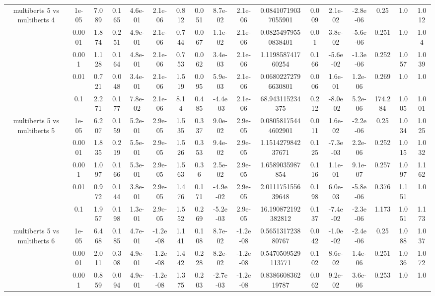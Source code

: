 \begin{tabular}{|c|c|c|c|c|c|c|c|c|c|c|c|c|c|c|c|c|}
\hline
\multirow{5}{*}{multiberts 5 vs multiberts 4} & 1e-05 & 7.089 & 0.165 & 4.6e-01 & 2.1e-06 & 0.812 & 0.051 & 8.7e-02 & 2.1e-06 & 0.08410719037055901 & 0.009 & 2.1e-02 & -2.8e-06 & 0.25 & 1.0 & 1.012 \\
 & 0.0001 & 1.874 & 0.251 & 4.9e-01 & 2.1e-06 & 0.744 & 0.067 & 1.1e-02 & 2.1e-06 & 0.08254979550838401 & 0.01 & 3.8e-02 & -5.6e-06 & 0.251 & 1.0 & 1.04 \\
 & 0.001 & 1.128 & 0.164 & 4.8e-01 & 2.1e-06 & 0.753 & 0.062 & 3.4e-03 & 2.1e-06 & 1.119858741760254 & 0.166 & -5.6e-02 & -1.3e-06 & 0.252 & 1.057 & 1.039 \\
 & 0.01 & 0.721 & 0.048 & 3.4e-01 & 2.1e-06 & 1.519 & 0.095 & 5.9e-03 & 2.1e-06 & 0.06802272796630801 & 0.006 & 1.6e-01 & 1.2e-06 & 0.269 & 1.0 & 1.0 \\
 & 0.1 & 2.271 & 0.177 & 7.8e-02 & 2.1e-06 & 8.14 & 0.485 & -4.4e-03 & 2.1e-06 & 68.943115234375 & 0.212 & -8.0e-02 & 5.2e-06 & 174.284 & 1.005 & 1.001 \\
\hline
\multirow{5}{*}{multiberts 5 vs multiberts 5} & 1e-05 & 6.207 & 0.159 & 5.2e-01 & 2.9e-05 & 1.535 & 0.337 & 9.0e-02 & 2.9e-05 & 0.08058175444602901 & 0.011 & 1.6e-02 & -2.2e-06 & 0.25 & 1.034 & 1.025 \\
 & 0.0001 & 1.835 & 0.219 & 5.5e-01 & 2.9e-05 & 1.526 & 0.353 & 9.4e-02 & 2.9e-05 & 1.151427984237671 & 0.125 & -7.3e-03 & 2.2e-06 & 0.252 & 1.015 & 1.032 \\
 & 0.001 & 1.097 & 0.166 & 5.3e-01 & 2.9e-05 & 1.563 & 0.36 & 2.5e-02 & 2.9e-05 & 1.6589035987854 & 0.116 & 1.1e-01 & 9.1e-07 & 0.257 & 1.097 & 1.162 \\
 & 0.01 & 0.972 & 0.144 & 3.8e-01 & 2.9e-05 & 1.476 & 0.171 & -4.9e-02 & 2.9e-05 & 2.011175155639648 & 0.198 & 6.0e-03 & -5.8e-06 & 0.376 & 1.151 & 1.0 \\
 & 0.1 & 1.957 & 0.198 & 1.3e-01 & 2.9e-05 & 1.552 & 0.269 & -5.2e-03 & 2.9e-05 & 16.190872192382812 & 0.137 & -7.4e-02 & -2.3e-06 & 1.173 & 1.051 & 1.173 \\
\hline
\multirow{5}{*}{multiberts 5 vs multiberts 6} & 1e-05 & 6.468 & 0.185 & 4.7e-01 & -1.2e-08 & 1.141 & 0.108 & 8.7e-02 & -1.2e-08 & 0.565131723880767 & 0.042 & -1.0e-02 & -2.4e-06 & 0.25 & 1.088 & 1.037 \\
 & 0.0001 & 2.011 & 0.308 & 4.9e-01 & -1.2e-08 & 1.442 & 0.228 & 8.2e-02 & -1.2e-08 & 0.5470509529113771 & 0.102 & 8.6e-02 & 1.4e-06 & 0.251 & 1.036 & 1.072 \\
 & 0.001 & 0.859 & 0.094 & 4.9e-01 & -1.2e-08 & 1.375 & 0.203 & -2.7e-03 & -1.2e-08 & 0.838660836219787 & 0.062 & 9.2e-02 & 3.6e-06 & 0.253 & 1.0 & 1.0 \\

\end{tabular}
